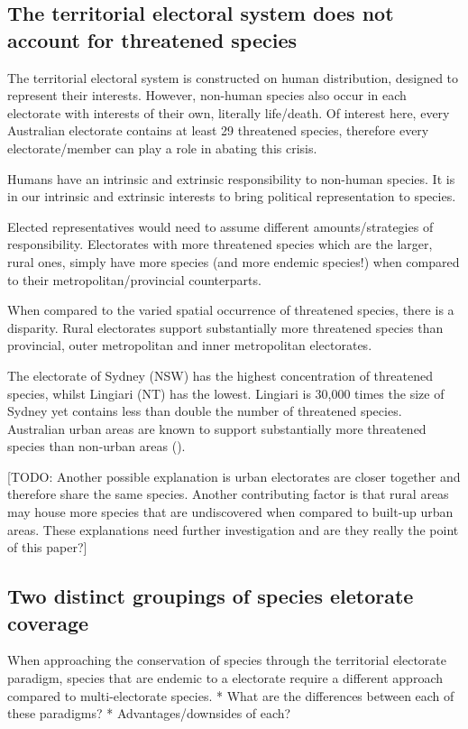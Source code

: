 \documentclass[a4paper,11pt]{article}
\begin{document}
\subsection{The territorial electoral system does not account for threatened species}

The territorial electoral system is constructed on human distribution, designed to represent their interests. However, non-human species also occur in each electorate with interests of their own, literally life/death. Of interest here, every Australian electorate contains at least 29 threatened species, therefore every electorate/member can play a role in abating this crisis.

Humans have an intrinsic and extrinsic responsibility to non-human species. 
It is in our intrinsic and extrinsic interests to bring political representation to species.

Elected representatives would need to assume different amounts/strategies of responsibility. Electorates with more threatened species which are the larger, rural ones, simply have more species (and more endemic species!) when compared to their metropolitan/provincial counterparts. 

When compared to the varied spatial occurrence of threatened species, there is a disparity. Rural electorates support substantially more threatened species than provincial, outer metropolitan and inner metropolitan electorates. 

The electorate of Sydney (NSW) has the highest concentration of threatened species, whilst Lingiari (NT) has the lowest. Lingiari is 30,000 times the size of Sydney yet contains less than double the number of threatened species. Australian urban areas are known to support substantially more threatened species than non-urban areas (\cite{ivesCitiesAreHotspots2016, soanesConservationOpportunitiesThreatened2020}). 

[TODO: Another possible explanation is urban electorates are closer together and therefore share the same species. Another contributing factor is that rural areas may house more species that are undiscovered when compared to built-up urban areas. These explanations need further investigation and are they really the point of this paper?]

\subsection{Two distinct groupings of species eletorate coverage}
When approaching the conservation of species through the territorial electorate paradigm, species that are endemic to a electorate require a different approach compared to multi-electorate species.
* What are the differences between each of these paradigms?
* Advantages/downsides of each?
\end{document}
